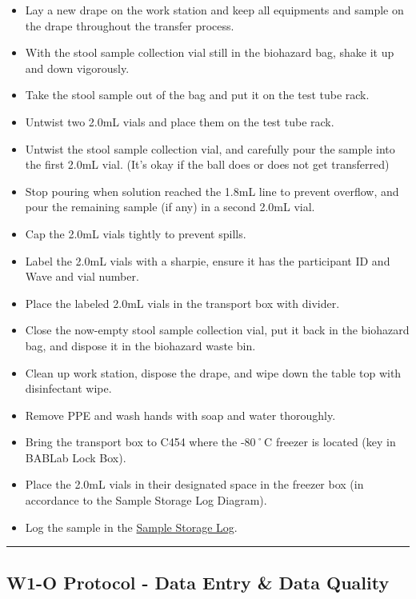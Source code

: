 \documentclass[
]{book}
\providecommand{\tightlist}{%
  \setlength{\itemsep}{0pt}\setlength{\parskip}{0pt}}
\begin{document}
\begin{itemize}
\tightlist
\item
  Lay a new drape on the work station and keep all equipments and sample on the drape throughout the transfer process.
\item
  With the stool sample collection vial still in the biohazard bag, shake it up and down vigorously.
\item
  Take the stool sample out of the bag and put it on the test tube rack.
\item
  Untwist two 2.0mL vials and place them on the test tube rack.
\item
  Untwist the stool sample collection vial, and carefully pour the sample into the first 2.0mL vial. (It's okay if the ball does or does not get transferred)
\item
  Stop pouring when solution reached the 1.8mL line to prevent overflow, and pour the remaining sample (if any) in a second 2.0mL vial.
\item
  Cap the 2.0mL vials tightly to prevent spills.
\item
  Label the 2.0mL vials with a sharpie, ensure it has the participant ID and Wave and vial number.
\item
  Place the labeled 2.0mL vials in the transport box with divider.
\item
  Close the now-empty stool sample collection vial, put it back in the biohazard bag, and dispose it in the biohazard waste bin.
\item
  Clean up work station, dispose the drape, and wipe down the table top with disinfectant wipe.
\item
  Remove PPE and wash hands with soap and water thoroughly.
\item
  Bring the transport box to C454 where the -80˚C freezer is located (key in BABLab Lock Box).
\item
  Place the 2.0mL vials in their designated space in the freezer box (in accordance to the Sample Storage Log Diagram).
\item
  Log the sample in the \href{https://app.box.com/file/630322897864}{Sample Storage Log}.
\end{itemize}

\begin{center}\rule{0.5\linewidth}{0.5pt}\end{center}

\hypertarget{w1-o-protocol---data-entry-data-quality}{%
\subsection{W1-O Protocol - Data Entry \& Data Quality}\label{w1-o-protocol---data-entry-data-quality}}
\end{document}
